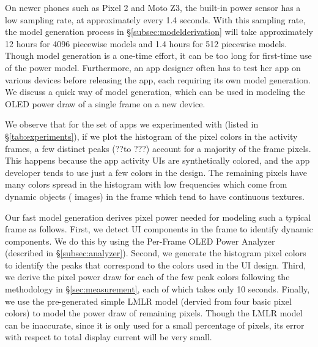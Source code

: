 On newer phones such as Pixel 2 and Moto Z3, the built-in power sensor has a low
sampling rate, at approximately every 1.4 seconds. With this sampling rate,
the model generation process in \S\ref{subsec:modelderivation} will take approximately 12 hours for 4096
piecewise models and 1.4 hours for 512 piecewise models.
Though model generation is a one-time effort,
it can be too long for first-time use of the power model.
Furthermore, an app designer often has to test her app on various
devices before releasing the app, each requiring its own model generation.
We discuss a quick way of model generation, which can be used
in modeling the OLED power draw of a single frame on a new device.

We observe that for the set of apps we experimented with (listed in
\S\ref{tab:experiments}), if we plot the histogram of the pixel colors
in the activity frames, a few distinct peaks (??to ???) account for a majority of
the frame pixels. This happens because the app activity UIs are
synthetically colored, and the app developer tends to use just a few colors
in the design. The remaining pixels have many colors spread in the
histogram with low frequencies which come from dynamic objects (\eg
images) in the frame which tend to have continuous textures.




Our fast model generation derives pixel power needed for modeling such
a typical frame as follows. First, we detect UI components in the frame to
identify dynamic components. We do this by using the Per-Frame OLED Power 
Analyzer (described in \S\ref{subsec:analyzer}).  Second, we generate the histogram
pixel colors to identify the peaks that correspond to the colors used
in the UI design. Third, we derive the pixel power draw for each of the few peak colors
following the methodology in \S\ref{sec:measurement},
each of which takes only 10 seconds. Finally,
we use the pre-generated simple LMLR model (dervied from four basic pixel colors)
to model the power draw of remaining pixels.
Though the LMLR model can be inaccurate, since it is only used for a small percentage of pixels,
its error with respect to total display current will be very small.

